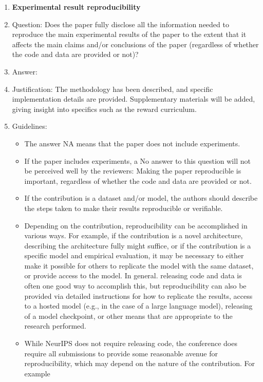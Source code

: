 \documentclass{article}
\begin{document}
\begin{enumerate}
    \item {\bf Experimental result reproducibility}
    \item[] Question: Does the paper fully disclose all the information needed to reproduce the main experimental results of the paper to the extent that it affects the main claims and/or conclusions of the paper (regardless of whether the code and data are provided or not)?
    \item[] Answer: \answerYes{} %
    \item[] Justification: The methodology has been described, and specific implementation details are provided. Supplementary materials will be added, giving insight into specifics such as the reward curriculum.
    \item[] Guidelines:
    \begin{itemize}
        \item The answer NA means that the paper does not include experiments.
        \item If the paper includes experiments, a No answer to this question will not be perceived well by the reviewers: Making the paper reproducible is important, regardless of whether the code and data are provided or not.
        \item If the contribution is a dataset and/or model, the authors should describe the steps taken to make their results reproducible or verifiable. 
        \item Depending on the contribution, reproducibility can be accomplished in various ways. For example, if the contribution is a novel architecture, describing the architecture fully might suffice, or if the contribution is a specific model and empirical evaluation, it may be necessary to either make it possible for others to replicate the model with the same dataset, or provide access to the model. In general. releasing code and data is often one good way to accomplish this, but reproducibility can also be provided via detailed instructions for how to replicate the results, access to a hosted model (e.g., in the case of a large language model), releasing of a model checkpoint, or other means that are appropriate to the research performed.
        \item While NeurIPS does not require releasing code, the conference does require all submissions to provide some reasonable avenue for reproducibility, which may depend on the nature of the contribution. For example
        \begin{enumerate}

\end{enumerate}
\end{itemize}
\end{enumerate}
\end{document}
